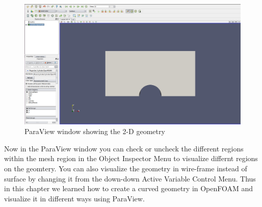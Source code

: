 \documentclass[a4paper,12pt]{report}
\begin{document}
\begin{figure}[ht]  
\begin{center}  
\includegraphics[scale=0.25]{paraview1.png}
\caption{ParaView window showing the 2-D geometry}
\label{paraview1}
\end{center}  
\end{figure}

\flushleft Now in the ParaView window you can check or uncheck the different regions within the mesh region in  the Object Inspector Menu to visualize differnt regions on the geomtery. You can also visualize the geometry in wire-frame instead of surface by changing it from the down-down Active Variable Control Menu.
\flushleft Thus in this chapter we learned how to create a curved geometry in OpenFOAM and visualize it in different ways using ParaView.
\end{document}
